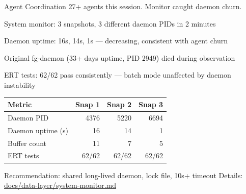 \documentclass[presentation]{beamer}
\begin{document}
\begin{frame}[label={sec:org8dbf71a}]{Agent Coordination}
27+ agents this session. Monitor caught daemon churn.
\begin{block}{System monitor: 3 snapshots, 3 different daemon PIDs in 2 minutes}
\end{block}
\begin{block}{Daemon uptime: 16s, 14s, 1s --- decreasing, consistent with agent churn}
\end{block}
\begin{block}{Original fg-daemon (33+ days uptime, PID 2949) died during observation}
\end{block}
\begin{block}{ERT tests: 62/62 pass consistently --- batch mode unaffected by daemon instability}
\begin{center}
\begin{tabular}{lrrr}
Metric & Snap 1 & Snap 2 & Snap 3\\
\hline
Daemon PID & 4376 & 5220 & 6694\\
Daemon uptime (s) & 16 & 14 & 1\\
Buffer count & 11 & 7 & 5\\
ERT tests & 62/62 & 62/62 & 62/62\\
\end{tabular}
\end{center}
\end{block}
\begin{block}{Recommendation: shared long-lived daemon, lock file, 10s+ timeout}
Details: \href{../../data-layer/system-monitor.md}{docs/data-layer/system-monitor.md}
\end{block}
\end{frame}
\end{document}

